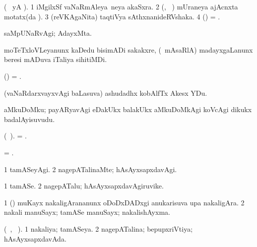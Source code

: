 \bentry
{}
\gl{\nA}  
\bmng
(\bava\   yA ). 
\bnum
\num{1} iMgilxSf vaNaRmAleya \,neya akaSxra. 
\num{2} (\biVga, \sA\ ) mUraneya ajAcnxta motatx(da \saMkeV). 
\num{3} (reVKAgaNita) taqtiVya sAthxnanideRVshaka.  
\num{4} (\ravi) =  .
\enum
\emng

\noindent
\gl{\pagu} 
\bmng
{} saMpUNaRvAgi; AdayxMta.
\emng
\eentry

\bentry
{} 
\gl{\nA}
\bmng
moTeTxloVLeyanunx kaDedu bisimADi sakakxre, (\kanmu\ mAsaRlA) madayxgaLanunx beresi mADuva iTaliya sihitiMDi.
\emng
\eentry

\bentry
{} 
\gl{\nA} 
\bmng
(\ame) = . 
\emng
\eentry

\bentry
{} 
\gl{\nA} 
\bmng
(vaNaRdarxvayxvAgi baLasuva) ashudadhx kobAlfTx Akesx YDu.
\emng
\eentry

\bentry
{} 
\gl{\nA} 
\bmng
aMkuDoMku; payARyavAgi eDakUkx balakUkx aMkuDoMkAgi koVcAgi dikukx badalAyisuvudu.
\emng
\eentry

\bentry
{} 
\gl{\nA} 
\bmng
(\bava\ ).
= .
\emng
\eentry

\bentry
{} 
\gl{\nA} 
\bmng
= .
\emng
\eentry

\bentry
{} 
\gl{\kirxvi} 
\bmng
\bnum
\num{1} tamASeyAgi. 
\num{2} nagepATalinaMte; hAsAyxsapxdavAgi.
\enum
\emng
\eentry

\bentry
{} 
\gl{\nA} 
\bmng
\bnum
\num{1} tamASe.
\num{2} nagepATalu; hAsAyxsapxdavAgiruvike.
\enum
\emng
\eentry

\bentry
{} 
\gl{\saMkiSx}
\bmng
{}
\emng
\eentry

\bentry
{} 
\gl{\nA} 
\bmng
\bnum
\num{1} (\ca) muKayx nakaligArananunx oDoDxDADxgi  anukarisuva upa nakaligAra. 
\num{2} nakali manuSayx; tamASe manuSayx; nakalishAyxma.
\enum
\emng
\eentry

\bentry 
{} 
\gl{\gu} 
\bmng
(\tara\ , \tama\ ).  
\bnum
\num{1} nakaliya; tamASeya. 
\num{2} nagepATalina; bepupxriVtiya; hAsAyxsapxdavAda.
\enum
\emng
\eentry

